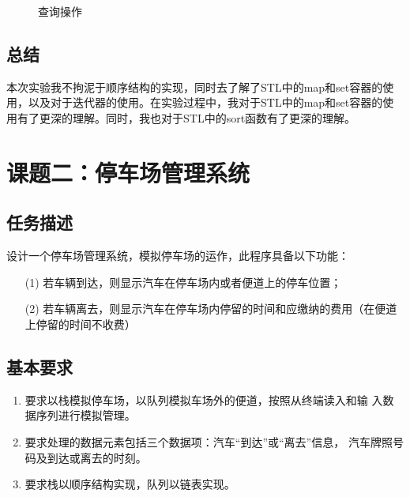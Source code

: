 \documentclass[UTF8,titlepage]{ctexart}
\numberwithin{figure}{section}
\begin{document}
\begin{enumerate}
    \begin{figure}[H]
    \centering
     \caption{查询操作}
     \label{}
    \end{figure}
\end{enumerate}
\subsection{总结}
本次实验我不拘泥于顺序结构的实现，同时去了解了STL中的map和set容器的使用，以及对于迭代器的使用。在实验过程中，我对于STL中的map和set容器的使用有了更深的理解。同时，我也对于STL中的sort函数有了更深的理解。
\clearpage
\section{课题二：停车场管理系统}
\subsection{任务描述}
设计一个停车场管理系统，模拟停车场的运作，此程序具备以下功能：
\begin{enumerate}
    \item[(1)] 若车辆到达，则显示汽车在停车场内或者便道上的停车位置；
    \item[(2)] 若车辆离去，则显示汽车在停车场内停留的时间和应缴纳的费用（在便道上停留的时间不收费）
\end{enumerate}

\subsection{基本要求}
\begin{enumerate}
    \item 要求以栈模拟停车场，以队列模拟车场外的便道，按照从终端读入和输
    入数据序列进行模拟管理。
    \item 要求处理的数据元素包括三个数据项：汽车“到达”或“离去”信息，
    汽车牌照号码及到达或离去的时刻。
    \item 要求栈以顺序结构实现，队列以链表实现。
\end{enumerate}
\end{document}
